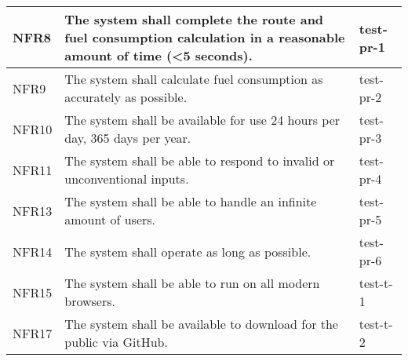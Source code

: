\documentclass[12pt, titlepage]{article}
\begin{document}
\begin{table}[!hbp]
\begin{tabular}{|p{3.5cm}|p{6.5cm}|p{4.5cm}|}
	NFR8                     & The system shall complete the route and fuel consumption calculation in a reasonable amount of time (<5 seconds).                                                                                                                                & test-pr-1                                                                                          \\ \hline
	NFR9                    & The system shall calculate fuel consumption as accurately as possible.                                                                                                                                & test-pr-2                                                                                          \\ \hline
	NFR10                     & The system shall be available for use 24 hours per day,  365 days per year.                                                                                                                                & test-pr-3                                                                                          \\ \hline
	NFR11                     & The system shall be able to respond to invalid or unconventional inputs.                                                                                                                                & test-pr-4                                                                                          \\ \hline
	NFR13                     & The system shall be able to handle an infinite amount of users.                                                                                                                                & test-pr-5                                                                                          \\ \hline
	NFR14                     & The system shall operate as long as possible.                                                                                                                                & test-pr-6                                                                                          \\ \hline
	NFR15                     & The system shall be able to run on all modern browsers.                                                                                                        & test-t-1                                                                                          \\ \hline
	NFR17                    & The system shall be available to download for the public via GitHub.                                                                                                        & test-t-2                                                                                          \\ \hline
	\end{tabular}
	
  \end{table}
  
\end{document}
